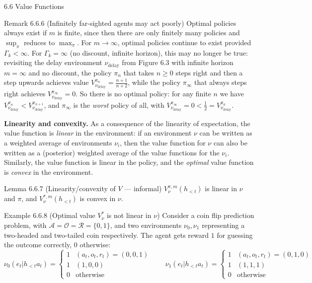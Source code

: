 \documentclass[aspectratio=169,10pt]{beamer}
\newcommand{\A}{\mathcal{A}}
\newcommand{\Ocal}{\mathcal{O}}
\newcommand{\Rcal}{\mathcal{R}}
\begin{document}
\begin{frame}[allowframebreaks]{6.6 Value Functions}
\framebreak

\begin{block}{Remark 6.6.6 (Infinitely far-sighted agents may act poorly)}
Optimal policies always exist if $m$ is finite, since then there are only
finitely many policies and $\sup_\pi$ reduces to $\max_\pi$. For $m \to
\infty$, optimal policies continue to exist provided $\Gamma_k < \infty$.
For $\Gamma_k = \infty$ (no discount, infinite horizon), this may no longer
be true: revisiting the delay environment $\nu_{\text{delay}}$ from Figure
6.3 with infinite horizon $m=\infty$ and no discount, the policy $\pi_n$
that takes $n \ge 0$ steps right and then a step upwards achieves value
$V^{\pi_n}_{\nu_{\text{delay}}} = \frac{n+1}{n+2}$, while the policy
$\pi_\infty$ that always steps right achieves
$V^{\pi_\infty}_{\nu_{\text{delay}}} = 0$. So there is no optimal policy:
for any finite $n$ we have $V^{\pi_n}_{\nu_{\text{delay}}} <
V^{\pi_{n+1}}_{\nu_{\text{delay}}}$, and $\pi_\infty$ is the \emph{worst}
policy of all, with
$V^{\pi_\infty}_{\nu_{\text{delay}}} = 0 < \tfrac12 = V^{\pi_0}_{\nu_{\text{delay}}}$.
\end{block}

\framebreak

\textbf{Linearity and convexity.} As a consequence of the linearity of
expectation, the value function is \emph{linear} in the environment: if an
environment $\nu$ can be written as a weighted average of environments
$\nu_i$, then the value function for $\nu$ can also be written as a
(posterior) weighted average of the value functions for the $\nu_i$.
Similarly, the value function is linear in the policy, and the
\emph{optimal} value function is \emph{convex} in the environment.

\begin{block}{Lemma 6.6.7 (Linearity/convexity of $V$ --- informal)}
$V^{\pi,m}_\nu(h_{<t})$ is linear in $\nu$ and $\pi$, and
$V^{*,m}_\nu(h_{<t})$ is convex in $\nu$.
\end{block}

\begin{block}{Example 6.6.8 (Optimal value $V^{*}_\nu$ is not linear in $\nu$)}
Consider a coin flip prediction problem, with $\A=\Ocal=\Rcal=\{0,1\}$, and
two environments $\nu_0, \nu_1$ representing a two-headed and two-tailed
coin respectively. The agent gets reward $1$ for guessing the outcome
correctly, $0$ otherwise:
\[
  \nu_0(e_t|h_{<t}a_t) = \begin{cases}1 & (a_t,o_t,r_t)=(0,0,1)\\1&(1,0,0)\\0&\text{otherwise}\end{cases}
  \qquad
  \nu_1(e_t|h_{<t}a_t) = \begin{cases}1 & (a_t,o_t,r_t)=(0,1,0)\\1&(1,1,1)\\0&\text{otherwise}\end{cases}
\]
\end{block}


\end{frame}
\end{document}
